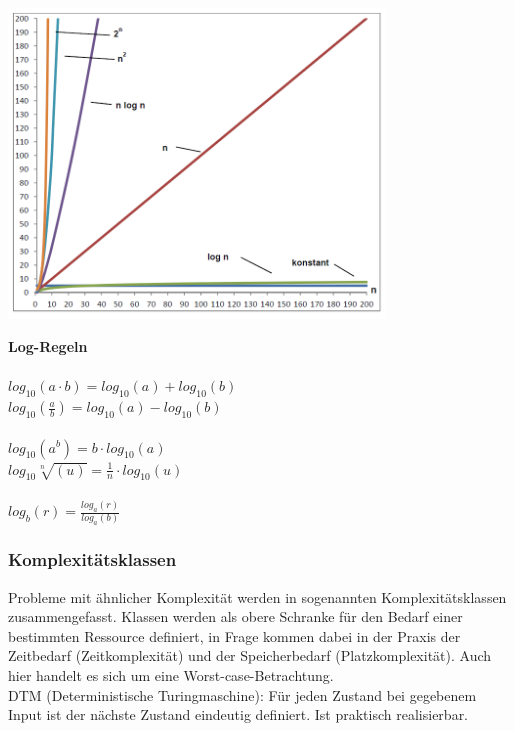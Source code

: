 \begin{minipage}{10cm}
\includegraphics[width=10cm]{images/Algorithmen/Wachstumsfunktionen.png}
\end{minipage}\qquad
\begin{minipage}{10cm}
\textbf{Log-Regeln}\\\\
$log_{10} (a \cdot b) = log_{10}(a)+log_{10}(b)$\\
$log_{10} (\frac{a}{b}) = log_{10}(a) - log_{10}(b)$\\ \\
$log_{10}(a^b) = b \cdot log_{10}(a)$\\
$log_{10}\sqrt[n]{(u)} = \frac{1}{n}\cdot log_{10}(u)$\\ \\
$log_{b}(r) = \frac{log_{a}(r)}{log_{a}(b)}$

\end{minipage}

\subsubsection{Komplexitätsklassen}
Probleme mit ähnlicher Komplexität werden in sogenannten Komplexitätsklassen zusammengefasst. Klassen werden als obere Schranke für den Bedarf einer bestimmten Ressource definiert, in Frage kommen dabei in der Praxis der Zeitbedarf (Zeitkomplexität) und der Speicherbedarf (Platzkomplexität). Auch hier handelt es sich um eine Worst-case-Betrachtung.\\

DTM (Deterministische Turingmaschine): Für jeden Zustand bei gegebenem Input ist der nächste Zustand eindeutig definiert. Ist praktisch realisierbar.\\

